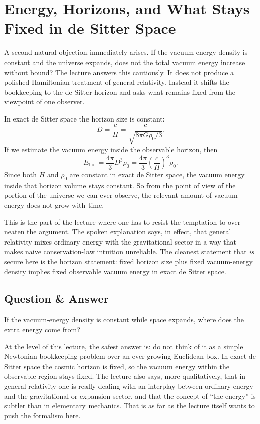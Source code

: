 \section{Energy, Horizons, and What Stays Fixed in de Sitter Space}

A second natural objection immediately arises. If the vacuum-energy density is constant and the universe expands, does not the total vacuum energy increase without bound? The lecture answers this cautiously. It does not produce a polished Hamiltonian treatment of general relativity. Instead it shifts the bookkeeping to the de Sitter horizon and asks what remains fixed from the viewpoint of one observer.

In exact de Sitter space the horizon size is constant:
\begin{equation}
D=\frac{c}{H}=\frac{c}{\sqrt{8\pi G\rho_0/3}}.
\end{equation}
If we estimate the vacuum energy inside the observable horizon, then
\begin{equation}
E_{\mathrm{hor}}=\frac{4\pi}{3}D^3\rho_0
=\frac{4\pi}{3}\left(\frac{c}{H}\right)^3\rho_0.
\end{equation}
Since both \(H\) and \(\rho_0\) are constant in exact de Sitter space, the vacuum energy inside that horizon volume stays constant. So from the point of view of the portion of the universe we can ever observe, the relevant amount of vacuum energy does not grow with time.

This is the part of the lecture where one has to resist the temptation to over-neaten the argument. The spoken explanation says, in effect, that general relativity mixes ordinary energy with the gravitational sector in a way that makes naive conservation-law intuition unreliable. The cleanest statement that \emph{is} secure here is the horizon statement: fixed horizon size plus fixed vacuum-energy density implies fixed observable vacuum energy in exact de Sitter space.

\subsection{Question \& Answer}

If the vacuum-energy density is constant while space expands, where does the extra energy come from?

At the level of this lecture, the safest answer is: do not think of it as a simple Newtonian bookkeeping problem over an ever-growing Euclidean box. In exact de Sitter space the cosmic horizon is fixed, so the vacuum energy within the observable region stays fixed. The lecture also says, more qualitatively, that in general relativity one is really dealing with an interplay between ordinary energy and the gravitational or expansion sector, and that the concept of ``the energy'' is subtler than in elementary mechanics. That is as far as the lecture itself wants to push the formalism here.

